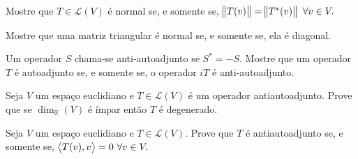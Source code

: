 \documentclass[11pt,a4paper]{article}
\begin{document}
\begin{exercicio}
Mostre que $T \in \mathcal{L}(V)$ é normal se, e somente se, $\norm{T(v)} = \norm{T^{*}(v)} \ \forall v \in V.$
\end{exercicio}

\begin{exercicio}
Mostre que uma matriz triangular é normal se, e somente se, ela é diagonal.
\end{exercicio}
\solucao{}
\begin{exercicio}
Um operador $S$ chama-se anti-autoadjunto se $S^{*} = -S.$ Mostre que um operador $T$ é autoadjunto se, e somente se, o operador $iT$ é anti-autoadjunto.
\end{exercicio}

\begin{exercicio}
Seja $V$ um espaço euclidiano e $T \in \mathcal{L}(V)$ é um operador antiautoadjunto. Prove que se $\dim_{\mathbb{R}}(V)$ é ímpar então $T$ é degenerado.
\end{exercicio}
\solucao{}

\begin{exercicio}
Seja $V$ um espaço euclidiano e $T \in \mathcal{L}(V).$ Prove que $T$ é antiautoadjunto se, e somente se, $\left\langle T(v), v \right\rangle = 0 \ \forall v \in V.$
\end{exercicio}
\solucao{}
\end{document}
